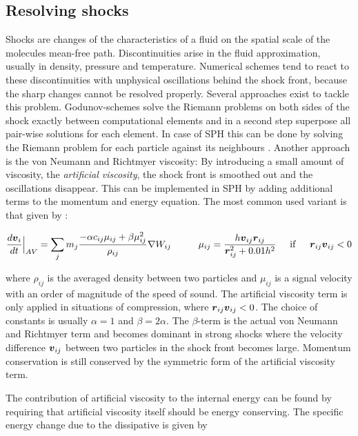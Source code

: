 \subsection{Resolving shocks}
Shocks are changes of the characteristics of a fluid on the spatial scale of the molecules mean-free path. Discontinuities arise in the fluid approximation, usually in density, pressure and temperature.
Numerical schemes tend to react to these discontinuities with unphysical oscillations behind the shock front, because the sharp changes cannot be resolved properly.
Several approaches exist to tackle this problem. Godunov-schemes solve the Riemann problems on both sides of the shock exactly between computational elements and in a second step superpose all pair-wise solutions for each element. In case of SPH this can be done by solving the Riemann problem for each particle against its neighbours \citep{Monaghan:1997p3938}.
Another approach is the von Neumann and Richtmyer viscosity: By introducing a small amount of viscosity, the \emph{artificial viscosity}, the shock front is smoothed out and the oscillations disappear. This can be implemented in SPH by adding additional terms to the momentum and energy equation. The most common used variant is that given by \citep{Monaghan:1992ARAA..30..543M}:

\begin{equation}
\label{ch02_sph02_eq016}
\frac{d \boldsymbol{v}_i }{dt} \Big|_{AV} = \sum_{j} m_j \frac{-\alpha c_{ij} \mu_{ij} + \beta \mu_{ij}^2}{\rho_{ij}} \nabla W_{ij} \hspace{1.0cm} \mu_{ij} = \frac{h \boldsymbol{v}_{ij} \boldsymbol{r}_{ij}}{\boldsymbol{r}_{ij}^2 + 0.01h^2}  \hspace{0.5cm} \mathrm{if}  \hspace{0.5cm} \boldsymbol{r}_{ij} \boldsymbol{v}_{ij} < 0
\end{equation}

where $\rho_{ij}$ is the averaged density between two particles and $\mu_{ij}$ is a signal velocity with an order of magnitude of the speed of sound. The artificial viscosity term is only applied in situations of compression, where $\boldsymbol{r}_{ij} \boldsymbol{v}_{ij} < 0$. The choice of constants is usually $\alpha = 1$ and $\beta = 2 \alpha$. The $\beta$-term is the actual von Neumann and Richtmyer term and becomes dominant in strong shocks where the velocity difference $\boldsymbol{v}_{ij}$ between two particles in the shock front becomes large. Momentum conservation is still conserved by the symmetric form of the artificial viscosity term.

The contribution of artificial viscosity to the internal energy can be found by requiring that artificial viscosity itself should be energy conserving. The specific energy change due to the dissipative is given by

